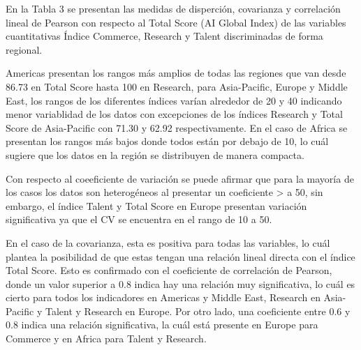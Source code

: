 \documentclass[
]{article}
\begin{document}
\begin{multicols}{2}

En la Tabla 3 se presentan las medidas de disperción, covarianza y correlación lineal de Pearson con respecto al Total Score (AI Global Index) de las variables cuantitativas Índice Commerce, Research y Talent discriminadas de forma regional. 

Americas presentan los rangos más amplios de todas las regiones que van desde 86.73 en Total Score hasta 100 en Research, para Asia-Pacific, Europe y Middle East, los rangos de los diferentes índices varían alrededor de 20 y 40 indicando menor variablidad de los datos con excepciones de los índices Research y Total Score de Asia-Pacific con 71.30 y  62.92 respectivamente. En el caso de Africa se presentan los rangos más bajos donde todos están por debajo de 10, lo cuál sugiere que los datos en la región se distribuyen de manera compacta.

Con respecto al coeeficiente de variación se puede afirmar que para la mayoría de los casos los datos son heterogéneos al presentar un coeficiente > a 50, sin embargo, el índice Talent y Total Score en Europe presentan variación significativa ya que el CV se encuentra en el rango de 10 a 50.

En el caso de la covarianza, esta es positiva para todas las variables, lo cuál plantea la posibilidad de que estas tengan una relación lineal directa con el índice Total Score. Esto es confirmado con el coeficiente de correlación de Pearson, donde un valor superior a 0.8 indica hay una relación muy significativa, lo cuál es cierto para todos los indicadores en Americas y Middle East, Research en Asia-Pacific y Talent y Research en Europe. Por otro lado, una coeficiente entre 0.6 y 0.8 indica una relación significativa, la cuál está presente en Europe para Commerce y en Africa para Talent y Research.


\end{multicols}
\end{document}
